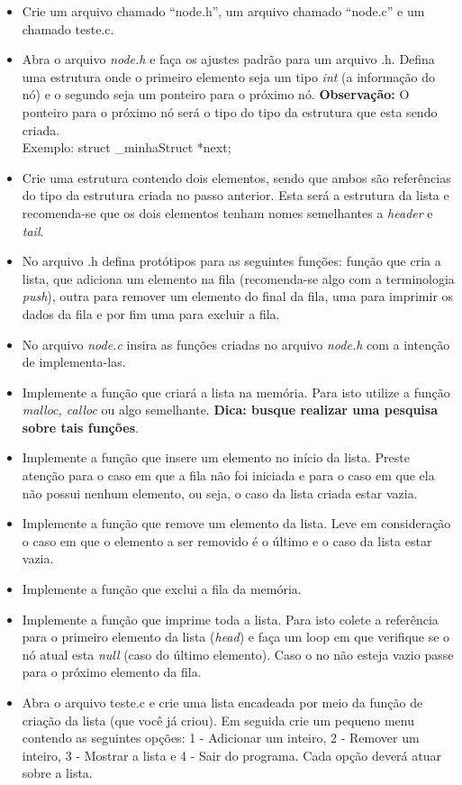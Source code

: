 \documentclass[a4paper,10pt]{article}
\begin{document}
\begin{enumerate}
  \begin{itemize}
   \item Crie um arquivo chamado ``node.h'', um arquivo chamado ``node.c'' e um chamado teste.c. 
   \item Abra o arquivo \emph{node.h} e faça os ajustes padrão para um arquivo .h. Defina uma estrutura onde o primeiro elemento seja 
	um tipo \emph{int} (a informação do nó) e o segundo seja um ponteiro para o próximo nó. \textbf{Observação:} O ponteiro para o próximo 
	nó será o tipo do tipo da estrutura que esta sendo criada. \\Exemplo: struct \_minhaStruct *next;
   \item Crie uma estrutura contendo dois elementos, sendo que ambos são referências do tipo da estrutura criada no passo anterior. Esta será 
	a estrutura da lista e recomenda-se que os dois elementos tenham nomes semelhantes a \emph{header} e \emph{tail}.
   \item No arquivo .h defina protótipos para as seguintes funções: função que cria a lista, que adiciona um elemento na fila (recomenda-se algo com 
	a terminologia \emph{push}), outra para remover um elemento do final da fila, uma para imprimir os dados da fila e por fim uma para 
	excluir a fila.
   \item No arquivo \emph{node.c} insira as funções criadas no arquivo \emph{node.h} com a intenção de implementa-las. 
   \item Implemente a função que criará a lista na memória. Para isto utilize a função \emph{malloc, calloc} ou algo semelhante. \textbf{Dica: 
	busque realizar uma pesquisa sobre tais funções}.
   \item Implemente a função que insere um elemento no início da lista. Preste atenção para o caso em que a fila não foi iniciada e para o caso 
	em que ela não possui nenhum elemento, ou seja, o caso da lista criada estar vazia.
   \item Implemente a função que remove um elemento da lista. Leve em consideração o caso em que o elemento a ser removido é o último e o caso 
	da lista estar vazia.
   \item Implemente a função que exclui a fila da memória.
   \item Implemente a função que imprime toda a lista. Para isto colete a referência para o primeiro elemento da lista (\emph{head}) e faça um 
	loop em que verifique se o nó atual esta \emph{null} (caso do último elemento). Caso o no não esteja vazio passe para o próximo elemento 
	da fila.
   \item Abra o arquivo teste.c e crie uma lista encadeada por meio da função de criação da lista (que você já criou). Em seguida crie um pequeno 
	menu contendo as seguintes opções: 1 - Adicionar um inteiro, 2 - Remover um inteiro, 3 - Mostrar a lista e 4 - Sair do programa. Cada 
	opção deverá atuar sobre a lista.
  \end{itemize}

\end{enumerate}
\end{document}
